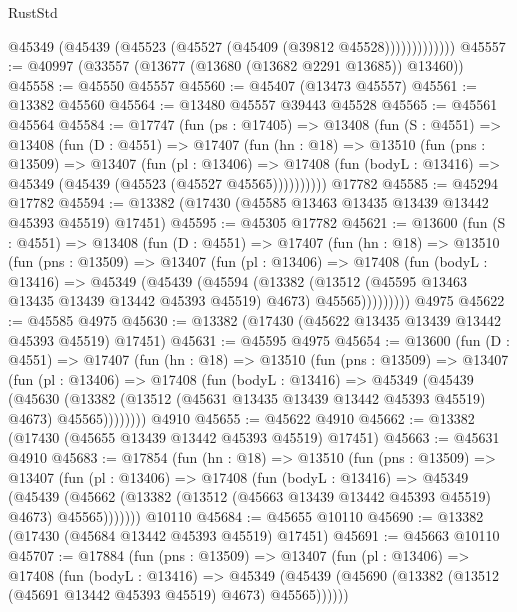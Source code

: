 \begin{lexlean}{RustStd}
\begin{coremodule}
                  @45349 (@45439 (@45523 (@45527 (@45409 (@39812 @45528)))))))))))))
@45557 := @40997 (@33557 (@13677 (@13680 (@13682 @2291 @13685)) @13460))
@45558 := @45550 @45557
@45560 := @45407 (@13473 @45557)
@45561 := @13382 @45560
@45564 := @13480 @45557 @39443 @45528
@45565 := @45561 @45564
@45584 := @17747
    (fun (ps : @17405) =>
    @13408
      (fun (S : @4551) =>
      @13408
        (fun (D : @4551) =>
        @17407
          (fun (hn : @18) =>
          @13510
            (fun (pns : @13509) =>
            @13407
              (fun (pl : @13406) =>
              @17408 (fun (bodyL : @13416) => @45349 (@45439 (@45523 (@45527 @45565))))))))))
    @17782
@45585 := @45294 @17782
@45594 := @13382 (@17430 (@45585 @13463 @13435 @13439 @13442 @45393 @45519) @17451)
@45595 := @45305 @17782
@45621 := @13600
    (fun (S : @4551) =>
    @13408
      (fun (D : @4551) =>
      @17407
        (fun (hn : @18) =>
        @13510
          (fun (pns : @13509) =>
          @13407
            (fun (pl : @13406) =>
            @17408
              (fun (bodyL : @13416) =>
              @45349
                (@45439
                  (@45594
                    (@13382
                      (@13512 (@45595 @13463 @13435 @13439 @13442 @45393 @45519) @4673)
                      @45565)))))))))
    @4975
@45622 := @45585 @4975
@45630 := @13382 (@17430 (@45622 @13435 @13439 @13442 @45393 @45519) @17451)
@45631 := @45595 @4975
@45654 := @13600
    (fun (D : @4551) =>
    @17407
      (fun (hn : @18) =>
      @13510
        (fun (pns : @13509) =>
        @13407
          (fun (pl : @13406) =>
          @17408
            (fun (bodyL : @13416) =>
            @45349
              (@45439
                (@45630
                  (@13382 (@13512 (@45631 @13435 @13439 @13442 @45393 @45519) @4673) @45565))))))))
    @4910
@45655 := @45622 @4910
@45662 := @13382 (@17430 (@45655 @13439 @13442 @45393 @45519) @17451)
@45663 := @45631 @4910
@45683 := @17854
    (fun (hn : @18) =>
    @13510
      (fun (pns : @13509) =>
      @13407
        (fun (pl : @13406) =>
        @17408
          (fun (bodyL : @13416) =>
          @45349
            (@45439
              (@45662 (@13382 (@13512 (@45663 @13439 @13442 @45393 @45519) @4673) @45565)))))))
    @10110
@45684 := @45655 @10110
@45690 := @13382 (@17430 (@45684 @13442 @45393 @45519) @17451)
@45691 := @45663 @10110
@45707 := @17884
    (fun (pns : @13509) =>
    @13407
      (fun (pl : @13406) =>
      @17408
        (fun (bodyL : @13416) =>
        @45349 (@45439 (@45690 (@13382 (@13512 (@45691 @13442 @45393 @45519) @4673) @45565))))))

\end{coremodule}
\end{lexlean}
